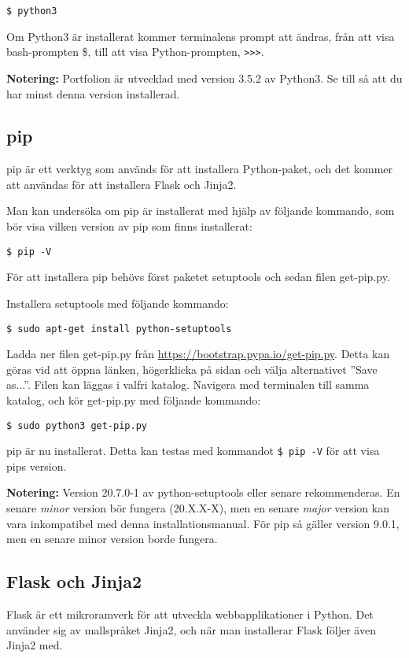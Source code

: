\documentclass{TDP003mall}
\begin{document}
\verb|$ python3|

Om Python3 är installerat kommer terminalens prompt att ändras, från att visa bash-prompten \$, till att visa Python-prompten, \verb|>>>|.

\textbf{Notering:} Portfolion är utvecklad med version 3.5.2 av Python3. Se till så att du har minst denna version installerad.

\subsection{pip}
pip är ett verktyg som används för att installera Python-paket, och det kommer att användas för att installera Flask och Jinja2.

Man kan undersöka om pip är installerat med hjälp av följande kommando, som bör visa vilken version av pip som finns installerat:

\verb|$ pip -V|

För att installera pip behövs först paketet setuptools och sedan filen get-pip.py.

Installera setuptools med följande kommando:

\verb|$ sudo apt-get install python-setuptools|

Ladda ner filen get-pip.py från \href{https://bootstrap.pypa.io/get-pip.py}{https://bootstrap.pypa.io/get-pip.py}. Detta kan göras vid att öppna länken, högerklicka på sidan och välja alternativet ''Save as...''. Filen kan läggas i valfri katalog. Navigera med terminalen till samma katalog, och kör get-pip.py med följande kommando:

\verb|$ sudo python3 get-pip.py|

pip är nu installerat. Detta kan testas med kommandot \verb|$ pip -V| för att visa pips version.

\textbf{Notering:} Version 20.7.0-1 av python-setuptools eller senare rekommenderas. En senare \textit{minor} version bör fungera (20.X.X-X), men en senare \textit{major} version kan vara inkompatibel med denna installationsmanual. För pip så gäller version 9.0.1, men en senare minor version borde fungera.


\subsection{Flask och Jinja2}

Flask är ett mikroramverk för att utveckla webbapplikationer i Python. Det använder sig av mallspråket Jinja2, och när man installerar Flask följer även Jinja2 med.
\end{document}
